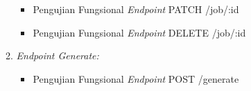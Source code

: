 \begin{enumerate}[label*=\arabic*.,ref=\arabic*]
\begin{enumerate}[label=\alph*.]
\begin{itemize}
                \item Pengujian Fungsional \textit{Endpoint} PATCH /job/:id
                \vspace{-0.5em}
                
                
                \item Pengujian Fungsional \textit{Endpoint} DELETE /job/:id
                \vspace{-0.5em}
                
                
            \end{itemize}
    
        \item \textit{Endpoint Generate:} 
            \begin{itemize}
            
                \item Pengujian Fungsional \textit{Endpoint} POST /generate
                \vspace{-0.5em}
                
                
            \end{itemize}
    \end{enumerate}
\end{enumerate}

